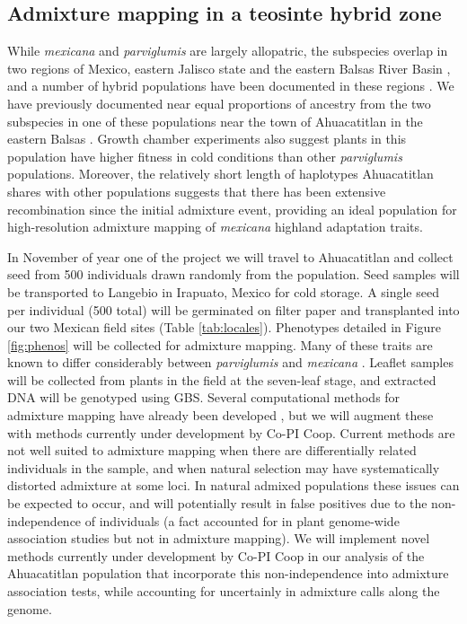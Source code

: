 \subsection{Admixture mapping in a teosinte hybrid zone} \label{subsec:admixmap}
While \emph{mexicana} and \emph{parviglumis} are largely allopatric, the subspecies overlap in two regions of Mexico, eastern Jalisco state and the eastern Balsas River Basin \citep{hufford2012inferences}, and a number of hybrid populations have been documented in these regions \citep{Fukunaga2005}.  We have previously documented near equal proportions of ancestry from the two subspecies in one of these populations near the town of Ahuacatitlan in the eastern Balsas \citep{Pyhajarvi2013}.  Growth chamber experiments also suggest plants in this population have higher fitness in cold conditions than other \emph{parviglumis} populations.  Moreover, the relatively short length of  haplotypes Ahuacatitlan shares with other  populations suggests that there has been extensive recombination since the initial admixture event, providing an ideal population for high-resolution admixture mapping of \emph{mexicana} highland adaptation traits.

In November of year one of the project we will travel to Ahuacatitlan and collect seed from 500 individuals drawn randomly from the population.  Seed samples will be transported to Langebio in Irapuato, Mexico for cold storage. A single seed per individual (500 total) will be germinated on filter paper and transplanted into our two Mexican field sites (Table \ref{tab:locales}).  Phenotypes detailed in Figure \ref{fig:phenos} will be collected for admixture mapping.  Many of these traits are known to differ considerably between \emph{parviglumis} and \emph{mexicana} \citep{wilkes1967teosinte}.  Leaflet samples will be collected from plants in the field at the seven-leaf stage, and extracted DNA will be genotyped using GBS.  Several computational methods for admixture mapping have already been developed \citep{winkler2010admixture}, but we will augment these with methods currently under development by Co-PI Coop. Current methods are not well suited to admixture mapping when there are differentially related individuals in the sample, and when natural selection may have systematically distorted admixture at some loci. In natural admixed populations these issues can be expected to occur, and will potentially result in false positives due to the non-independence of individuals (a fact accounted for in plant genome-wide association studies but not in admixture mapping). We will implement novel methods currently under development by Co-PI Coop in our analysis of the Ahuacatitlan population that incorporate this non-independence into admixture association tests, while accounting for uncertainly in admixture calls along the genome. 

